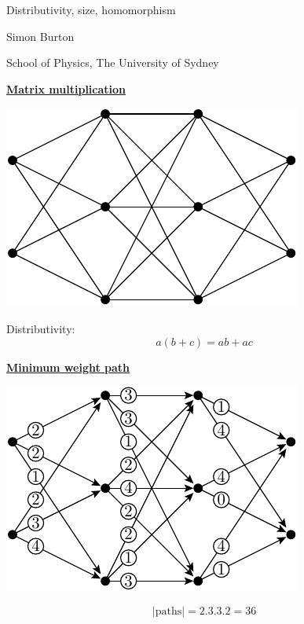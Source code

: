 \documentclass[11pt]{article}
\def\heading #1{\centerline{\underline{\bf\LARGE #1}}}
\def\vsp {\vskip 0.5cm}
\begin{document}
\large




\centerline{\LARGE }
\vskip 0.5cm
\centerline{\LARGE Distributivity, size, homomorphism}
\vskip 0.5cm
\centerline{\LARGE }

\vskip 1cm

\centerline{\Large Simon Burton}

\vskip 0.5cm

\centerline{School of Physics, The University of Sydney}


%
%
%
%
%

\newpage %

\heading{Matrix multiplication}

\centerline{\includegraphics[]{pic-trellis.pdf}}

Distributivity:
$$
    a(b + c) = ab + ac
$$
\vsp\vsp
\vsp\vsp

\newpage %

\heading{Minimum weight path}
\centerline{\includegraphics[]{pic-minpath-0.pdf}}
$$
    |\mbox{paths}| = 2.3.3.2 = 36
$$
\end{document}
